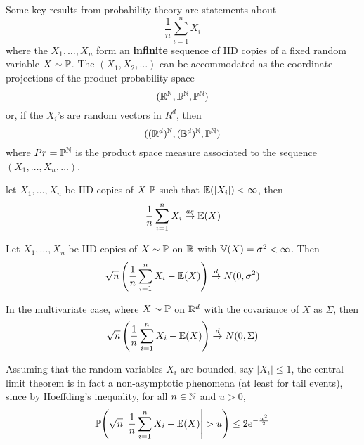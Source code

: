 Some key results from probability theory are statements about
\begin{equation}
  \label{eq:15}
  \frac{1}{n} \sum_{i=1}^{n} X_{i}
\end{equation} where the $X_{1}, \dots, X_{n}$ form an
\textbf{infinite} sequence of IID copies of a fixed random variable $X
\sim \Prob$.  The $(X_{1}, X_{2}, \dots)$ can be accommodated as the
coordinate projections of the product probability space
\begin{equation}
  \label{eq:16}
  (\R^{\N}, \mathbb{B}^{\N}, \Prob^{\N})
\end{equation} or, if the $X_{i}$'s are random vectors in $R^{d}$,
then
\begin{equation}
  \label{eq:17}
  ((\R^{d})^{\N}, (\mathbb{B}^{d})^{\N}, \Prob^{\N})
\end{equation} where $Pr = \Prob^{\N}$ is the product space measure
associated to the sequence $(X_{1}, \dots, X_{n}, \dots)$.

\begin{thm}
  \label{defn:stochastic_convergence_concepts:1}
  let $X_{1}, \dots, X_n$ be IID copies of $X ~ \Prob$ such that
  $\E{|X_{i}|} < \infty$, then
  \begin{equation}
    \label{eq:18}
    \frac{1}{n} \sum_{i=1}^{n} X_{i} \cas \E{X}
  \end{equation}
\end{thm}

\begin{thm}
  \label{defn:stochastic_convergence_concepts:2}
  Let $X_{1}, \dots, X_{n}$ be IID copies of $X \sim \Prob$ on $\mathbb{R}$
  with $\Var{X} = \sigma^{2} < \infty$. Then
  \begin{equation}
    \label{eq:19}
    \sqrt{n}\left(\frac{1}{n} \sum_{i=1}^{n} X_{i} - \E{X}\right) \cd N(0, \sigma^{2})
  \end{equation}

  In the multivariate case, where $X \sim \Prob$ on $\mathbb{R}^{d}$ with the
  covariance of $X$ as $\Sigma$, then
  \begin{equation}
    \label{eq:21}
    \sqrt{n} \left(\frac{1}{n} \sum_{i=1}^{n} X_{i} - \E{X}\right) \cd N(0, \Sigma)
  \end{equation}
\end{thm}

Assuming that the random variables $X_{i}$ are bounded, say $|X_{i}|
\leq 1$, the central limit theorem is in fact a non-asymptotic
phenomena (at least for tail events), since by Hoeffding's inequality,
for all $n \in \mathbb{N}$ and $u > 0$,
\begin{equation}
  \label{eq:22}
  \Prob{\sqrt{n} \left| \frac{1}{n} \sum_{i=1}^{n}X_{i} - \E{X}
    \right| > u} \leq 2 e^{-\frac{u^{2}}{2}}
\end{equation}

